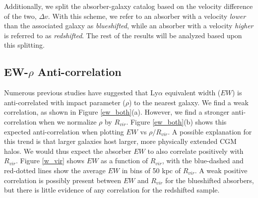 \documentclass[iop]{emulateapj-rtx4}
\begin{document}
Additionally, we split the absorber-galaxy catalog based on the velocity difference of the two, $\Delta v$. With this scheme, we refer to an absorber with a velocity \textit{lower} than the associated galaxy as \textit{blueshifted}, while an absorber with a velocity \textit{higher} is referred to as \textit{redshifted}. The rest of the results will be analyzed based upon this splitting. 





\subsection{EW-$\rho$ Anti-correlation}
Numerous previous studies have suggested that Ly$\alpha$ equivalent width ($EW$) is anti-correlated with impact parameter ($\rho$) to the nearest galaxy. We find a weak correlation, as shown in Figure \ref{ew_both}(a). However, we find a stronger anti-correlation when we normalize $\rho$ by $R_{vir}$. Figure \ref{ew_both}(b) shows this expected anti-correlation when plotting $EW$ vs $\rho/R_{vir}$. A possible explanation for this trend is that larger galaxies host larger, more physically extended CGM halos. We would thus expect the absorber $EW$ to also correlate positively with $R_{vir}$. Figure \ref{w_vir} shows $EW$ as a function of $R_{vir}$, with the blue-dashed and red-dotted lines show the average $EW$ in bins of 50 kpc of $R_{vir}$. A weak positive correlation is possibly present between $EW$ and $R_{vir}$ for the blueshifted absorbers, but there is little evidence of any correlation for the redshifted sample. 
\end{document}
